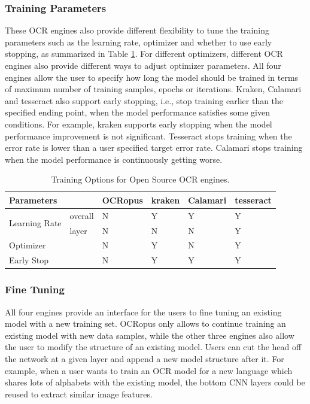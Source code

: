 \documentclass[conference]{IEEEtran}
\begin{document}
\subsubsection*{Training Parameters}
These OCR engines also provide different flexibility to tune the training parameters such as the learning rate, optimizer and whether to use early stopping, as summarized in Table \ref{tab:training_options}. For different optimizers, different OCR engines also provide different ways to adjust optimizer parameters. All four engines allow the user to specify how long the model should be trained in terms of maximum number of training samples, epochs or iterations. Kraken, Calamari and tesseract also support early stopping, i.e., stop training earlier than the specified ending point, when the model performance satisfies some given conditions. For example, kraken supports early stopping when the model performance improvement is not significant. Tesseract stops training when the error rate is lower than a user specified target error rate. Calamari stops training when the model performance is continuously getting worse.
\begin{table}[bt]
\begin{tabular}{llllll}
\hline
Parameters & & OCRopus     & kraken                      & Calamari & tesseract\\ \hline
\multirow{2}{*}{Learning Rate}& overall & N & Y & Y & Y\\ 
&layer & N & N  & N & Y \\
\hline
Optimizer &  &  N & Y & N & Y \\\hline
Early Stop & & N & Y & Y & Y \\
\end{tabular}
\caption{Training Options for Open Source OCR engines.}
\label{tab:training_options}
\end{table}
\subsubsection*{Fine Tuning}
All four engines provide an interface for the users to fine tuning an existing model with a new training set. OCRopus only allows to continue training an existing model with new data samples, while the other three engines also allow the user to modify the structure of an existing model. Users can cut the head off the network at a given layer and append a new model structure after it. For example, when a user wants to train an OCR model for a new language which shares lots of alphabets with the existing model, the bottom CNN layers could be reused to extract similar image features.
\end{document}
